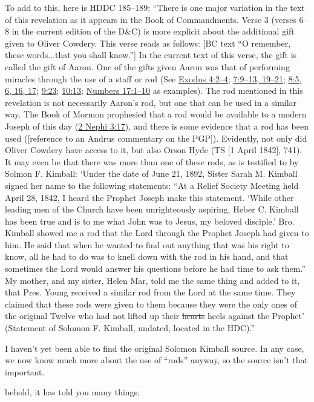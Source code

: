 {			To add to this, here is HDDC 185--189: ``There is one major variation in the text of this revelation as it appears in the Book of Commandments. Verse 3 (verses 6--8 in the current edition of the D\&C) is more explicit about the additional gift given to Oliver Cowdery. This verse reads as follows: [BC text ``O remember, these words...that you shall know.''] In the current text of this verse, the gift is called the gift of Aaron. One of the gifts given Aaron was that of performing miracles through the use of a staff or rod (See \hyperref[EXODUS-4-2]{Exodus 4:2--4}; \hyperref[EXODUS-7-9]{7:9--13, 19--21}; \hyperref[EXODUS-8-5]{8:5, 6, 16, 17}; \hyperref[EXODUS-9-23]{9:23}; \hyperref[EXODUS-10-13]{10:13}; \hyperref[NUMBERS-17-1]{Numbers 17:1--10} as examples). The rod mentioned in this revelation is not necessarily Aaron's rod, but one that can be used in a similar way. The Book of Mormon prophesied that a rod would be available to a modern Joseph of this day (\hyperref[2NEPHI-3-17]{2 Nephi 3:17}), and there is some evidence that a rod has been used ([reference to an Andrus commentary on the PGP]). Evidently, not only did Oliver Cowdery have access to it, but also Orson Hyde (TS [1 April 1842], 741). It may even be that there was more than one of these rods, as is testified to by Solmon F. Kimball: `Under the date of June 21, 1892, Sister Sarah M. Kimball signed her name to the following statements: ``At a Relief Society Meeting held April 28, 1842, I heard the Prophet Joseph make this statement. `While other leading men of the Church have been unrighteously aspiring, Heber C. Kimball has been true and is to me what John was to Jesus, my beloved disciple.' Bro. Kimball showed me a rod that the Lord through the Prophet Joseph had given to him. He said that when he wanted to find out anything that was his right to know, all he had to do was to knell down with the rod in his hand, and that sometimes the Lord would answer his questions before he had time to ask them.'' My mother, and my sister, Helen Mar, told me the same thing and added to it, that Pres. Young received a similar rod from the Lord at the same time. They claimed that these rods were given to them because they were the only ones of the original Twelve who had not lifted up their \sout{hearts} heels against the Prophet' (Statement of Solomon F. Kimball, undated, located in the HDC).''
			
			I haven't yet been able to find the original Solomon Kimball source. In any case, we now know much more about the use of ``rods'' anyway, so the source isn't that important.
			}
		behold, it has told you many things;

